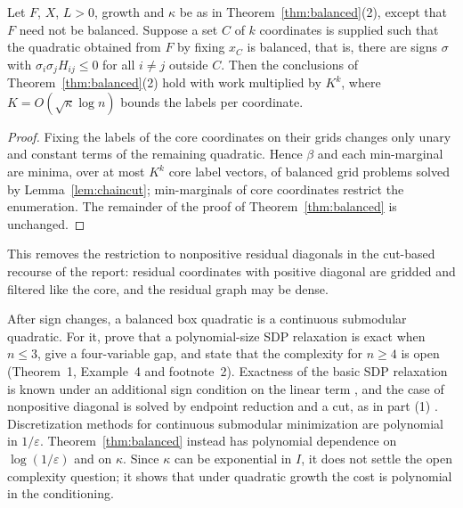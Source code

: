 \begin{corollary}\label{cor:core}
Let $F$, $X$, $L>0$, growth and $\kappa$ be as in Theorem~\ref{thm:balanced}(2), except that
$F$ need not be balanced. Suppose a set $C$ of $k$ coordinates is supplied such that the
quadratic obtained from $F$ by fixing $x_C$ is balanced, that is, there are signs $\sigma$ with
$\sigma_i\sigma_jH_{ij}\le0$ for all $i\neq j$ outside $C$. Then the conclusions of
Theorem~\ref{thm:balanced}(2) hold with work multiplied by
$K^{k}$, where $K=O(\sqrt\kappa\log n)$ bounds the labels per coordinate.
\end{corollary}

\begin{proof}
Fixing the labels of the core coordinates on their grids changes only unary and constant terms of
the remaining quadratic. Hence $\beta$ and each min-marginal are minima, over at most $K^k$ core
label vectors, of balanced grid problems solved by Lemma~\ref{lem:chaincut}; min-marginals of
core coordinates restrict the enumeration. The remainder of the proof of
Theorem~\ref{thm:balanced} is unchanged.
\end{proof}

This removes the restriction to nonpositive residual diagonals in the cut-based recourse of the
report: residual coordinates with positive diagonal are gridded and filtered like the core, and
the residual graph may be dense.

\begin{remark}
After sign changes, a balanced box quadratic is a continuous submodular quadratic. For it,
\cite{BurerNatarajanWillemsen2026v3} prove that a polynomial-size SDP relaxation is exact when
$n\le3$, give a four-variable gap, and state that the complexity for $n\ge4$ is open
(Theorem~1, Example~4 and footnote~2). Exactness of the basic SDP relaxation is known under an
additional sign condition on the linear term \cite{KimKojima2003}, and the case of nonpositive
diagonal is solved by endpoint reduction and a cut, as in part (1)
\cite{BurerNatarajanWillemsen2026v3,Padberg1989}. Discretization methods for continuous
submodular minimization \cite{Bach2019,Bach2018Isotonic,AxelrodLiuSidford2020} are polynomial
in $1/\varepsilon$. Theorem~\ref{thm:balanced} instead has polynomial dependence on
$\log(1/\varepsilon)$ and on $\kappa$. Since $\kappa$ can be exponential in $I$, it does not
settle the open complexity question; it shows that under quadratic growth the cost is
polynomial in the conditioning.
\end{remark}


